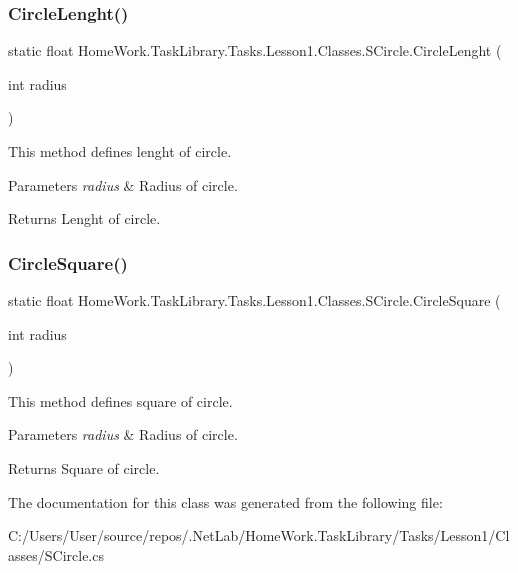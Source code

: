 \subsubsection{\texorpdfstring{CircleLenght()}{CircleLenght()}}
{\footnotesize\ttfamily static float Home\+Work.\+Task\+Library.\+Tasks.\+Lesson1.\+Classes.\+S\+Circle.\+Circle\+Lenght (\begin{DoxyParamCaption}\item[{int}]{radius }\end{DoxyParamCaption})\hspace{0.3cm}{\ttfamily [static]}}



This method defines lenght of circle. 


\begin{DoxyParams}{Parameters}
{\em radius} & Radius of circle.\\
\hline
\end{DoxyParams}
\begin{DoxyReturn}{Returns}
Lenght of circle.
\end{DoxyReturn}
\mbox{\label{class_home_work_1_1_task_library_1_1_tasks_1_1_lesson1_1_1_classes_1_1_s_circle_a6845fb0f75930aaf1afe2768a0748ba1}} 
\subsubsection{\texorpdfstring{CircleSquare()}{CircleSquare()}}
{\footnotesize\ttfamily static float Home\+Work.\+Task\+Library.\+Tasks.\+Lesson1.\+Classes.\+S\+Circle.\+Circle\+Square (\begin{DoxyParamCaption}\item[{int}]{radius }\end{DoxyParamCaption})\hspace{0.3cm}{\ttfamily [static]}}



This method defines square of circle. 


\begin{DoxyParams}{Parameters}
{\em radius} & Radius of circle.\\
\hline
\end{DoxyParams}
\begin{DoxyReturn}{Returns}
Square of circle.
\end{DoxyReturn}


The documentation for this class was generated from the following file\+:\begin{DoxyCompactItemize}
\item 
C\+:/\+Users/\+User/source/repos/.\+Net\+Lab/\+Home\+Work.\+Task\+Library/\+Tasks/\+Lesson1/\+Classes/S\+Circle.\+cs\end{DoxyCompactItemize}
